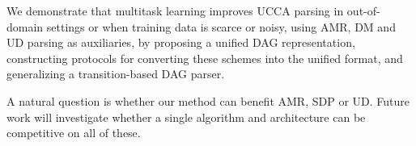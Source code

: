 \documentclass[a0,portrait]{a0poster}
\begin{document}
\begin{multicols}{2}
We demonstrate that multitask learning improves UCCA parsing in out-of-domain settings
or when training data is scarce or noisy,
using AMR, DM and UD parsing as auxiliaries,
by proposing a unified DAG representation,
constructing protocols for converting these schemes into the unified format,
and generalizing a transition-based DAG parser.

A natural question is whether our method can benefit AMR, SDP or UD.
Future work will investigate whether a single
algorithm and architecture can be competitive on all of these.

\color{DarkSlateGray}
\tiny



\end{multicols}
\end{document}
